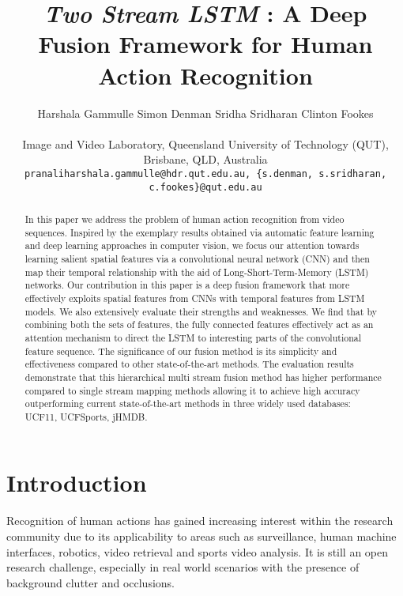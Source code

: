\documentclass[10pt,twocolumn,letterpaper]{article}
\begin{document}
\title{\textit{Two Stream LSTM} : A Deep Fusion Framework for Human Action Recognition}


\author{Harshala Gammulle \hspace{1cm} Simon Denman \hspace{1cm} Sridha Sridharan \hspace{1cm} Clinton Fookes\\
\\Image and Video Laboratory, Queensland University of Technology (QUT), Brisbane, QLD, Australia\\
{\tt\small pranaliharshala.gammulle@hdr.qut.edu.au, \{s.denman, s.sridharan, c.fookes\}@qut.edu.au}
}


\maketitle
\ifwacvfinal\thispagestyle{empty}\fi

\begin{abstract}
   In this paper we address the problem of human action recognition from video sequences. Inspired by the exemplary results obtained via automatic feature learning and deep learning approaches in computer vision, we focus our attention towards learning salient spatial features via a convolutional neural network (CNN) and then map their temporal relationship with the aid of Long-Short-Term-Memory (LSTM) networks. Our contribution in this paper is a deep fusion framework that more effectively exploits spatial features from CNNs with temporal features from LSTM models. We also extensively evaluate their strengths and weaknesses. We find that by combining both the sets of features, the fully connected features effectively act as an attention mechanism to direct the LSTM to interesting parts of the convolutional feature sequence. The significance of our fusion method is its simplicity and effectiveness compared to other state-of-the-art methods. The evaluation results demonstrate that this hierarchical multi stream fusion method has higher performance compared to single stream mapping methods allowing it to achieve high accuracy outperforming current state-of-the-art methods in three widely used databases: UCF11, UCFSports, jHMDB.
\end{abstract}


\section{Introduction}

	Recognition of human actions has gained increasing interest within the research community due to its applicability to areas such as surveillance, human machine interfaces, robotics, video retrieval and sports video analysis. It is still an open research challenge, especially in real world scenarios with the presence of background clutter and occlusions.
	
\end{document}
